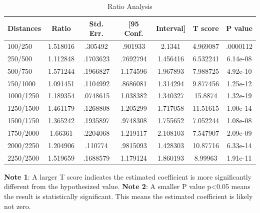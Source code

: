 \documentclass[12pt]{article}
\begin{document}
\begin{table}[h]
\centering
\caption{Ratio Analysis}
\begin{tabular}{l|c|c|cc|c|c}
\hline\hline
Distances   &       Ratio&   Std. Err.&  [95 Conf.&   Interval]&     T score&     P value\\
\hline
100/250     &    1.518016&     .305492&     .901933&      2.1341&    4.969087&    .0000112\\
250/500     &    1.112848&    .1703623&    .7692794&    1.456416&    6.532241&    6.14e-08\\
500/750     &    1.571244&    .1966827&    1.174596&    1.967893&    7.988725&    4.92e-10\\
750/1000    &    1.091451&    .1104992&    .8686081&    1.314294&    9.877456&    1.25e-12\\
1000/1250   &    1.189354&    .0748615&    1.038382&    1.340327&     15.8874&    1.32e-19\\
1250/1500   &    1.461179&    .1268808&    1.205299&    1.717058&    11.51615&    1.00e-14\\
1500/1750   &    1.365242&    .1935897&    .9748308&    1.755652&    7.052244&    1.08e-08\\
1750/2000   &     1.66361&    .2204068&    1.219117&    2.108103&    7.547907&    2.09e-09\\
2000/2250   &    1.204906&     .110774&    .9815093&    1.428303&    10.87716&    6.33e-14\\
2250/2500  &    1.519659&    .1688579&    1.179124&    1.860193&     8.99963&    1.91e-11\\
\hline\hline
\end{tabular}
\flushleft
\begin{footnotesize}
\begin{singlespace}
\textbf{Note 1}: A larger T score indicates the estimated coefficient is more significantly different from the hypothesized value.
\textbf{Note 2}: A smaller P value p<0.05 means the result is statistically significant. This means the estimated coefficient is likely not zero.
\end{singlespace}
\end{footnotesize}
\end{table}

\end{document}
